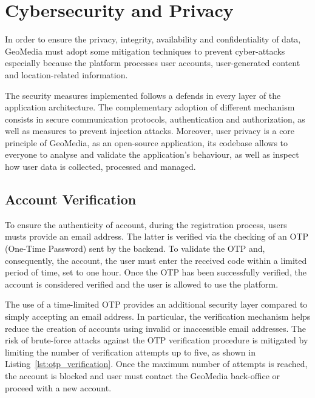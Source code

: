 \section{Cybersecurity and Privacy}

In order to ensure the privacy, integrity, availability and confidentiality of data, GeoMedia must adopt some mitigation techniques to prevent cyber-attacks especially because the platform processes user accounts, user-generated content and location-related information.

The security measures implemented follows a defends in every layer of the application architecture. The complementary adoption of different mechanism consists in secure communication protocols, authentication and authorization, as well as measures to prevent injection attacks. Moreover, user privacy is a core principle of GeoMedia, as an open-source application, its codebase allows to everyone to analyse and validate the application's behaviour, as well as inspect how user data is collected, processed and managed.

\subsection{Account Verification}


To ensure the authenticity of account, during the registration process, users musts provide an email address. The latter is verified via the checking of an OTP (One-Time Password) sent by the backend. To validate the OTP and, consequently, the account, the user must enter the received code within a limited period of time, set to one hour. Once the OTP has been successfully verified, the account is considered verified and the user is allowed to use the platform.

The use of a time-limited OTP provides an additional security layer compared to simply accepting an email address. In particular, the verification mechanism helps reduce the creation of accounts using invalid or inaccessible email addresses. The risk of brute-force attacks against the OTP verification procedure is mitigated by limiting the number of verification attempts up to five, as shown in Listing~\ref{lst:otp_verification}. Once the maximum number of attempts is reached, the account is blocked and user must contact the GeoMedia back-office or proceed with a new account.


